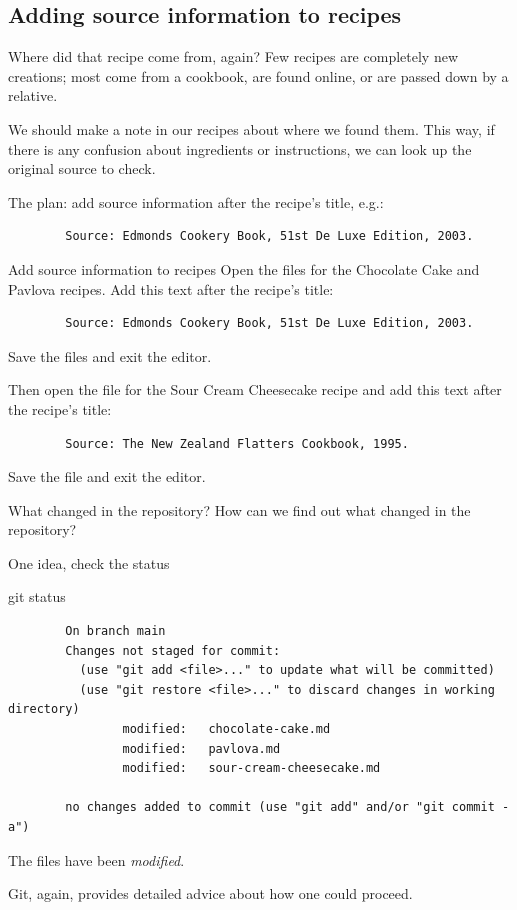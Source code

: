 \subsection{Adding source information to recipes}

\begin{frame}[fragile]{Where did that recipe come from, again?}
    Few recipes are completely new creations; most come from a cookbook,
    are found online, or are passed down by a relative.

    We should make a note in our recipes about where we found them.  This
    way, if there is any confusion about ingredients or instructions, we can
    look up the original source to check.

    The plan: add source information after the recipe's title, e.g.:
    \begin{verbatim}
        Source: Edmonds Cookery Book, 51st De Luxe Edition, 2003.
    \end{verbatim}
\end{frame}

\begin{frame}[fragile]{Add source information to recipes}
    Open the files for the Chocolate Cake and Pavlova recipes.  Add this
    text after the recipe's title:
    \begin{verbatim}
        Source: Edmonds Cookery Book, 51st De Luxe Edition, 2003.
    \end{verbatim}

    Save the files and exit the editor.

    Then open the file for the Sour Cream Cheesecake recipe and add this
    text after the recipe's title:
    \begin{verbatim}
        Source: The New Zealand Flatters Cookbook, 1995.
    \end{verbatim}

    Save the file and exit the editor.
\end{frame}

\begin{frame}[fragile]{What changed in the repository?}
    How can we find out what changed in the repository?

    One idea, check the status
    \begin{shellcode}
        git status
    \end{shellcode}
    \begin{verbatim}
        On branch main
        Changes not staged for commit:
          (use "git add <file>..." to update what will be committed)
          (use "git restore <file>..." to discard changes in working directory)
                modified:   chocolate-cake.md
                modified:   pavlova.md
                modified:   sour-cream-cheesecake.md

        no changes added to commit (use "git add" and/or "git commit -a")
    \end{verbatim}

    The files have been \emph{modified}.

    Git, again, provides detailed advice about how one could proceed.
\end{frame}

